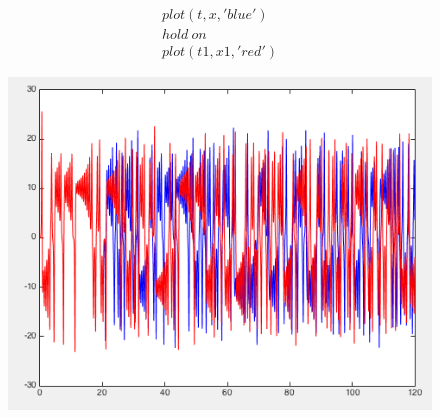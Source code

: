 \documentclass[10pt,a4paper]{article}
\begin{document}
\begin{align}
plot(t,x,'blue')
\\hold \: on \nonumber
\\plot(t1,x1,'red') \nonumber
\end{align}

\begin{figure}[H]
\centering
\includegraphics[width=0.9\linewidth]{../screenshots/lorenz_t.png}
\end{figure}
\end{document}
